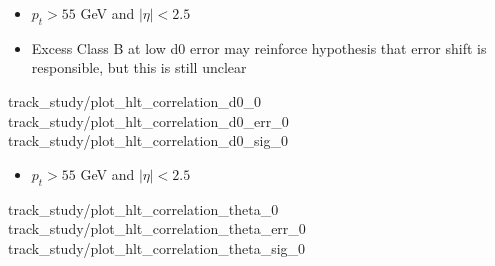 
    { \begin{itemize}
        \item $p_t > 55$ GeV and $|\eta| < 2.5$
        \item Excess Class B at low d0 error may reinforce hypothesis that error shift is responsible,
            but this is still unclear
    \end{itemize} }
    {track_study/plot_hlt_correlation_d0_0}
    {track_study/plot_hlt_correlation_d0_err_0}
    {track_study/plot_hlt_correlation_d0_sig_0}

    { \begin{itemize}
        \item $p_t > 55$ GeV and $|\eta| < 2.5$
    \end{itemize} }
    {track_study/plot_hlt_correlation_theta_0}
    {track_study/plot_hlt_correlation_theta_err_0}
    {track_study/plot_hlt_correlation_theta_sig_0}
